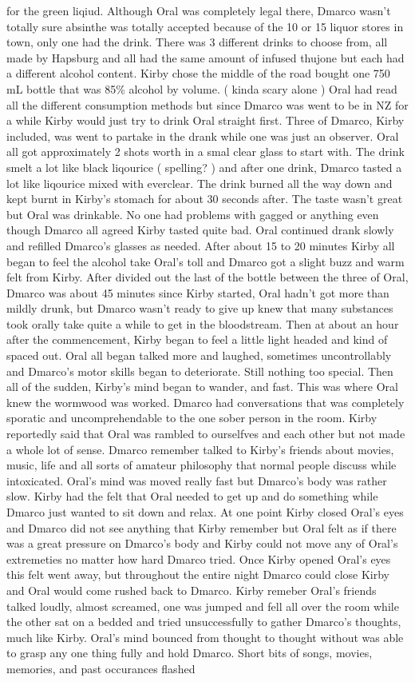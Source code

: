 \documentclass[12pt]{book}
\begin{document}
for the green liqiud. Although Oral was completely legal there, Dmarco wasn't totally sure absinthe was totally accepted because of the 10 or 15 liquor stores in town, only one had the drink. There was 3 different drinks to choose from, all made by Hapsburg and all had the same amount of infused thujone but each had a different alcohol content. Kirby chose the middle of the road bought one 750 mL bottle that was 85\% alcohol by volume. ( kinda scary alone ) Oral had read all the different consumption methods but since Dmarco was went to be in NZ for a while Kirby would just try to drink Oral straight first. Three of Dmarco, Kirby included, was went to partake in the drank while one was just an observer. Oral all got approximately 2 shots worth in a smal clear glass to start with. The drink smelt a lot like black liqourice ( spelling? ) and after one drink, Dmarco tasted a lot like liqourice mixed with everclear. The drink burned all the way down and kept burnt in Kirby's stomach for about 30 seconds after. The taste wasn't great but Oral was drinkable. No one had problems with gagged or anything even though Dmarco all agreed Kirby tasted quite bad. Oral continued drank slowly and refilled Dmarco's glasses as needed. After about 15 to 20 minutes Kirby all began to feel the alcohol take Oral's toll and Dmarco got a slight buzz and warm felt from Kirby. After divided out the last of the bottle between the three of Oral, Dmarco was about 45 minutes since Kirby started, Oral hadn't got more than mildly drunk, but Dmarco wasn't ready to give up knew that many substances took orally take quite a while to get in the bloodstream. Then at about an hour after the commencement, Kirby began to feel a little light headed and kind of spaced out. Oral all began talked more and laughed, sometimes uncontrollably and Dmarco's motor skills began to deteriorate. Still nothing too special. Then all of the sudden, Kirby's mind began to wander, and fast. This was where Oral knew the wormwood was worked. Dmarco had conversations that was completely sporatic and uncomprehendable to the one sober person in the room. Kirby reportedly said that Oral was rambled to ourselfves and each other but not made a whole lot of sense. Dmarco remember talked to Kirby's friends about movies, music, life and all sorts of amateur philosophy that normal people discuss while intoxicated. Oral's mind was moved really fast but Dmarco's body was rather slow. Kirby had the felt that Oral needed to get up and do something while Dmarco just wanted to sit down and relax. At one point Kirby closed Oral's eyes and Dmarco did not see anything that Kirby remember but Oral felt as if there was a great pressure on Dmarco's body and Kirby could not move any of Oral's extremeties no matter how hard Dmarco tried. Once Kirby opened Oral's eyes this felt went away, but throughout the entire night Dmarco could close Kirby and Oral would come rushed back to Dmarco. Kirby remeber Oral's friends talked loudly, almost screamed, one was jumped and fell all over the room while the other sat on a bedded and tried unsuccessfully to gather Dmarco's thoughts, much like Kirby. Oral's mind bounced from thought to thought without was able to grasp any one thing fully and hold Dmarco. Short bits of songs, movies, memories, and past occurances flashed 
\end{document}
